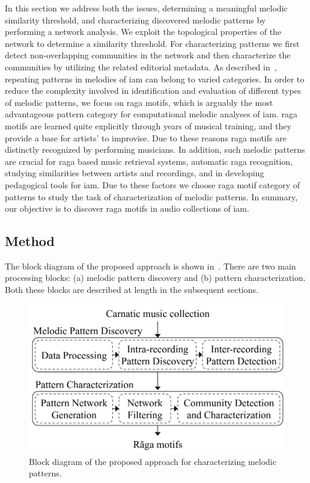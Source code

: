 {In this section we address both the issues, determining a meaningful melodic similarity threshold, and characterizing discovered melodic patterns by performing a network analysis. We exploit the topological properties of the network to determine a similarity threshold. For characterizing patterns we first detect non-overlapping communities in the network and then characterize the communities by utilizing the related editorial metadata. As described in~, repeating patterns in melodies of \gls{iam} can belong to varied categories. In order to reduce the complexity involved in identification and evaluation of different types of melodic patterns, we focus on \gls{raga} motifs, which is arguably the most advantageous pattern category for computational melodic analyses of \gls{iam}. \Gls{raga} motifs are learned quite explicitly through years of musical training, and they provide a base for artists' to improvise. Due to these reasons \gls{raga} motifs are distinctly recognized by performing musicians. In addition, such melodic patterns are crucial for \gls{raga} based music retrieval systems, automatic \gls{raga} recognition, studying similarities between artists and recordings, and in developing pedagogical tools for \gls{iam}. Due to these factors we choose \gls{raga} motif category of patterns to study the task of characterization of melodic patterns. In summary, our objective is to discover \gls{raga} motifs in audio collections of \gls{iam}.


\subsection{Method}

The block diagram of the proposed approach is shown in~. There are two main processing blocks: (a) melodic pattern discovery and (b) pattern characterization. Both these blocks are described at length in the subsequent sections.

\begin{figure}
	\begin{center}
		\includegraphics[width=\figSizeSeventy]{ch06_patterns/figures/Characterization/blockDiagram.pdf}
	\end{center}
	\caption[Block diagram for characterizing melodic patterns]{Block diagram of the proposed approach for characterizing melodic patterns.}
	\label{fig:block_diagram_characterization}
\end{figure}


}
